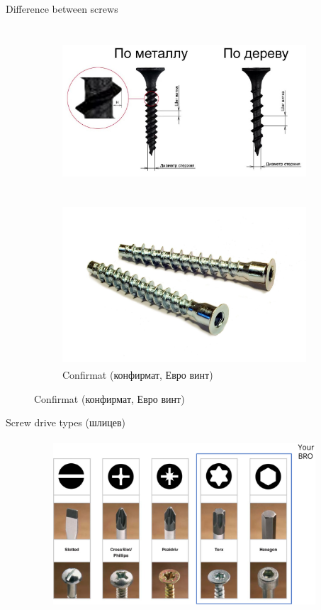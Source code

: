 \documentclass[aspectratio=169]{beamer}
\begin{document}
\begin{frame}[t]{Difference between screws}
    \framesubtitle{}
    \vspace{-0.6cm}

    \begin{figure}[H]
        \begin{subfigure}{0.64\textwidth}
            \centering\includegraphics[height=6cm,width=1\textwidth,keepaspectratio]{diff_btw_screws.jpg}
            \label{fig:diff_btw_screws.jpg}
        \end{subfigure}
        \begin{subfigure}{0.34\textwidth}
            \centering\includegraphics[height=6cm,width=1\textwidth,keepaspectratio]{komfirmat.jpg}
            \caption*{Confirmat (конфирмат, Евро винт)}
            \label{fig:komfirmat.jpg}
        \end{subfigure}
    \end{figure}
\end{frame}


\begin{frame}[t]{Screw drive types (шлицев)}
    \framesubtitle{}
    \vspace{-0.6cm}
    \begin{figure}[H]
        \centering\includegraphics[height=6cm,width=1\textwidth,keepaspectratio]{screw_drive_types.png}
        \label{fig:screw_drive_types.png}
    \end{figure}
\end{frame}
\end{document}
